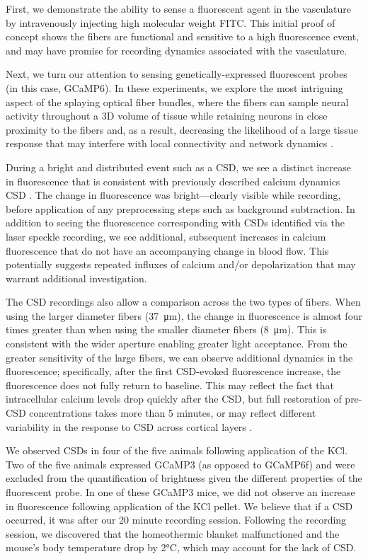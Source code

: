 First, we demonstrate the ability to sense a fluorescent agent in the 
vasculature by intravenously injecting high molecular weight FITC. 
This initial proof of concept shows the fibers are functional and 
sensitive to a high fluorescence event, and may have promise for 
recording dynamics associated with the vasculature.

Next, we turn our attention to sensing genetically-expressed 
fluorescent probes (in this case, GCaMP6). In these experiments, we 
explore the most intriguing aspect of the splaying optical fiber 
bundles, where the fibers can sample neural activity throughout a 3D 
volume of tissue while retaining neurons in close proximity to the 
fibers and, as a result, decreasing the likelihood of a large tissue 
response that may interfere with local connectivity and network 
dynamics \cite{Perkins:2018ae}.

During a bright and distributed event such as a CSD, we see a distinct
 increase in fluorescence that is consistent with previously described
 calcium dynamics CSD \cite{Gniel:2010jn}. The change in fluorescence 
was bright---clearly visible while recording, before application of 
any preprocessing steps such as background subtraction. In addition to
 seeing the fluorescence corresponding with CSDs identified via the 
laser speckle recording, we see additional, subsequent increases in 
calcium fluorescence that do not have an accompanying change in blood 
flow. This potentially suggests repeated influxes of calcium and/or 
depolarization that may warrant additional investigation.

The CSD recordings also allow a comparison across the two types of 
fibers. When using the larger diameter fibers (37~\si{\micro\meter}), 
the change in fluorescence is almost four times greater than when 
using the smaller diameter fibers (8~\si{\micro\meter}). This is 
consistent with the wider aperture enabling greater light acceptance. 
From the greater sensitivity of the large fibers, we can observe 
additional dynamics in the fluorescence; specifically, after the first
 CSD-evoked fluorescence increase, the fluorescence does not fully 
return to baseline. This may reflect the fact that intracellular 
calcium levels drop quickly after the CSD, but full restoration of 
pre-CSD concentrations takes more than 5 minutes, or may reflect 
different variability in the response to CSD across cortical layers 
\cite{Gniel:2010jn}.

We observed CSDs in four of the five animals following application of 
the KCl. Two of the five animals expressed GCaMP3 (as opposed to 
GCaMP6f) and were excluded from the quantification of brightness given
 the different properties of the fluorescent probe. In one of these 
GCaMP3 mice, we did not observe an increase in fluorescence following 
application of the KCl pellet. We believe that if a CSD occurred, it 
was after our 20 minute recording session. Following the recording 
session, we discovered that the homeothermic blanket malfunctioned and
 the mouse's body temperature drop by 2\si{\celsius}, which may 
account for the lack of CSD.

